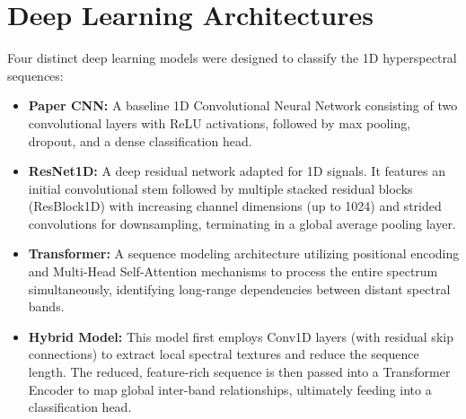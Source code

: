 \documentclass[ 12pt,a4paper,twocolumn,fleqn]{report}
\begin{document}
\section{Deep Learning Architectures}
\vspace{2mm}
Four distinct deep learning models were designed to classify the 1D hyperspectral sequences:
\begin{itemize}
    \item \textbf{Paper CNN:} A baseline 1D Convolutional Neural Network consisting of two convolutional layers with ReLU activations, followed by max pooling, dropout, and a dense classification head.
    \item \textbf{ResNet1D:} A deep residual network adapted for 1D signals. It features an initial convolutional stem followed by multiple stacked residual blocks (ResBlock1D) with increasing channel dimensions (up to 1024) and strided convolutions for downsampling, terminating in a global average pooling layer.
    \item \textbf{Transformer:} A sequence modeling architecture utilizing positional encoding and Multi-Head Self-Attention mechanisms to process the entire spectrum simultaneously, identifying long-range dependencies between distant spectral bands.
    \item \textbf{Hybrid Model:} This model first employs Conv1D layers (with residual skip connections) to extract local spectral textures and reduce the sequence length. The reduced, feature-rich sequence is then passed into a Transformer Encoder to map global inter-band relationships, ultimately feeding into a classification head.
\end{itemize}

\newpage
  \pagestyle{fancy}

\normalsize
\end{document}
